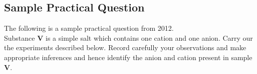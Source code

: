 %
%

\subsection{Sample Practical Question}
The following is a sample practical question from 2012.\\[6pt]


Substance \textbf{V} is a simple salt which contains one cation and one anion. Carry our the experiments described below. Record carefully your observations and make appropriate inferences and hence identify the anion and cation present in sample \textbf{V}.\\

